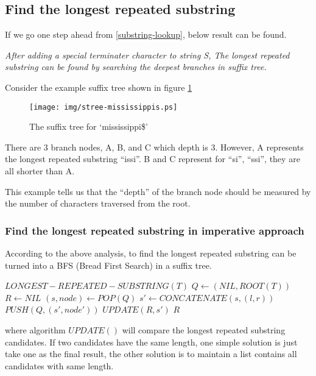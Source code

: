 \documentclass{article}
\begin{document}
\subsection{Find the longest repeated substring}

If we go one step ahead from \ref{substring-lookup}, below result can
be found.

{\em After adding a special terminater character to string S, The 
longest repeated substring can be found by searching the 
deepest branches in suffix tree.}

Consider the example suffix tree shown in figure \ref{fig:stree-mississippis}

\begin{figure}[htbp]
   \begin{center}
      \texttt{[image: img/stree-mississippis.ps]}
      \caption{The suffix tree for `mississippi\$'} \label{fig:stree-mississippis}
   \end{center}
\end{figure}

There are 3 branch nodes, A, B, and C which depth is 3. However, A represents
the longest repeated substring ``issi''. B and C represent for ``si'', ``ssi'',
they are all shorter than A. 

This example tells us that the ``depth'' of the branch node should be measured
by the number of characters traversed from the root.

\subsubsection{Find the longest repeated substring in imperative approach}
According to the above analysis, to find the longest repeated substring
can be turned into a BFS (Bread First Search) in a suffix tree.

\begin{algorithmic}
\STATE $LONGEST-REPEATED-SUBSTRING(T)$
  \STATE $Q \leftarrow (NIL, ROOT(T))$
  \STATE $R \leftarrow NIL$
    \STATE $(s, node) \leftarrow POP(Q)$
        \STATE $s' \leftarrow CONCATENATE(s, (l, r))$
        \STATE $PUSH(Q, (s', node'))$
        \STATE $UPDATE(R, s')$
      \ENDIF
    \ENDFOR
  \ENDWHILE
  \RETURN $R$
\end{algorithmic}

where algorithm $UPDATE()$ will compare the longest repeated substring
candidates. If two candidates have the same length, one simple solution
is just take one as the final result, the other solution is to maintain
a list contains all candidates with same length.
\end{document}
